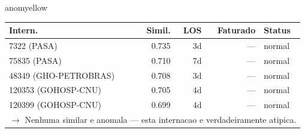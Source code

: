 \documentclass[a4paper,10pt]{article}
\begin{document}
\begin{anomalycard}[Internacao 7721 | GHO-PETROBRAS | MODERADO (z=2.26)]{anomyellow}
\begin{tabular}{l r r r l}\toprule\textbf{Intern.} & \textbf{Simil.} & \textbf{LOS} & \textbf{Faturado} & \textbf{Status} \\\midrule
7322 (PASA) & 0.735 & 3d & --- & \textcolor{jcubeblue}{normal} \\
75835 (PASA) & 0.710 & 7d & --- & \textcolor{jcubeblue}{normal} \\
48349 (GHO-PETROBRAS) & 0.708 & 3d & --- & \textcolor{jcubeblue}{normal} \\
120353 (GOHOSP-CNU) & 0.705 & 4d & --- & \textcolor{jcubeblue}{normal} \\
120399 (GOHOSP-CNU) & 0.699 & 4d & --- & \textcolor{jcubeblue}{normal} \\
\multicolumn{5}{l}{\textcolor{jcubeblue}{\small $\rightarrow$ Nenhuma similar e anomala --- esta internacao e verdadeiramente atipica.}} \\
\bottomrule\end{tabular}


\end{anomalycard}

\newpage
\end{document}
